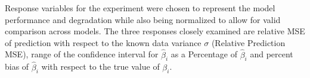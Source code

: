 \documentclass[../../paper.tex]{subfiles}
\begin{document}
Response variables for the experiment were chosen to represent the model performance
and degradation while also being normalized to allow for valid comparison across
models. The three responses closely examined are relative MSE of prediction
with respect to the known data variance $\sigma$ (Relative Prediction MSE), range of the confidence interval for $\hat{\beta}_{i}$ as a Percentage of $\hat{\beta}_{i}$
and percent bias of $\hat{\beta}_{i}$ with respect to the true value of $\beta_{i}$.



\end{document}
